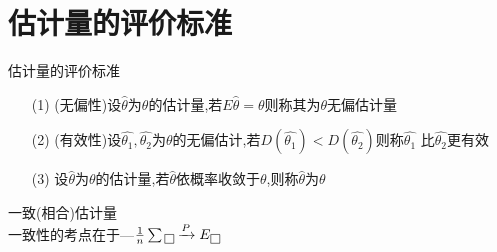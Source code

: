 \documentclass[12pt, a4paper, oneside, UTF8]{ctexbook}
\begin{document}
\section{估计量的评价标准}
\begin{remark}
    估计量的评价标准
    \begin{enumerate}
    \item[(1)] (无偏性)设$\hat{\theta}$为$\theta$的估计量,若$E\hat{\theta}=\theta$则称其为$\theta$无偏估计量
    \item[(2)] (有效性)设$\hat{\theta_1},\hat{\theta_2}$为$\theta$的无偏估计,若$D(\hat{\theta_1})<D(\hat{\theta_2})$则称$\hat{\theta_1}$
    比$\hat{\theta_2}$更有效 
    \item[(3)] 设$\hat{\theta}$为$\theta$的估计量,若$\hat{\theta}$依概率收敛于$\theta$,则称$\hat{\theta}$为$\theta$
    \end{enumerate}
    一致(相合)估计量 \\
    一致性的考点在于---$\frac{1}{n}\sum\fbox{}\xrightarrow{P}E\fbox{}$
\end{remark}
\end{document}
